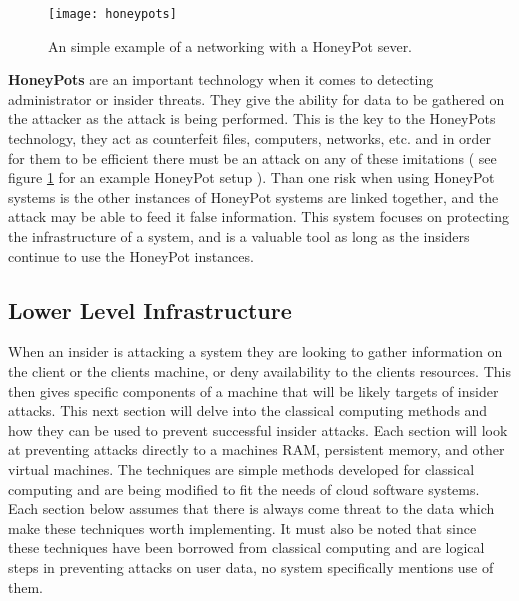 \label{hlHoneyPots}

\begin{figure}
  \centering
    \texttt{[image: honeypots]}
  \caption{An simple example of a networking with a HoneyPot sever.}
  \label{honeypot_image}
\end{figure}

\textbf{HoneyPots} are an important technology when it comes to detecting administrator or insider threats. They give the ability for data to be gathered on the attacker as the attack is being performed. This is the key to the HoneyPots technology, they act as counterfeit files, computers, networks, etc. and in order for them to be efficient there must be an attack on any of these imitations ( see figure \ref{honeypot_image} for an example HoneyPot setup ). \cite{spitzner} Than one risk when using HoneyPot systems is the other instances of HoneyPot systems are linked together, and the attack may be able to feed it false information. This system focuses on protecting the infrastructure of a system, and is a valuable tool as long as the insiders continue to use the HoneyPot instances. \cite{spitzner}

\subsection{Lower Level Infrastructure}
\label{llInfrastructure}

When an insider is attacking a system they are looking to gather information on the client or the clients machine, or deny availability to the clients resources. \cite{kandias} This then gives specific components of a machine that will be likely targets of insider attacks. This next section will delve into the classical computing methods and how they can be used to prevent successful insider attacks. Each section will look at preventing attacks directly to a machines RAM, persistent memory, and other virtual machines. The techniques are simple methods developed for classical computing and are being modified to fit the needs of cloud software systems. Each section below assumes that there is always come threat to the data which make these techniques worth implementing. It must also be noted that since these techniques have been borrowed from classical computing and are logical steps in preventing attacks on user data, no system specifically mentions use of them. \cite{szefer}

\label{llEncryption}

